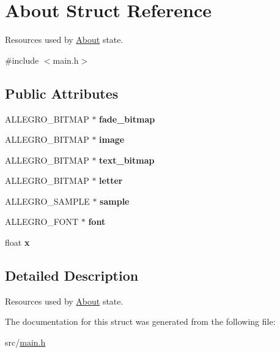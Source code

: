\hypertarget{structAbout}{\section{\-About \-Struct \-Reference}
\label{structAbout}
}


\-Resources used by \hyperlink{structAbout}{\-About} state.  




{\ttfamily \#include $<$main.\-h$>$}

\subsection*{\-Public \-Attributes}
\begin{DoxyCompactItemize}
\item 
\hypertarget{structAbout_a0c80b08e1d60093504bed342b41e51c1}{\-A\-L\-L\-E\-G\-R\-O\-\_\-\-B\-I\-T\-M\-A\-P $\ast$ {\bfseries fade\-\_\-bitmap}}\label{structAbout_a0c80b08e1d60093504bed342b41e51c1}

\item 
\hypertarget{structAbout_a96fca071ec385ca06ca40faf212838fb}{\-A\-L\-L\-E\-G\-R\-O\-\_\-\-B\-I\-T\-M\-A\-P $\ast$ {\bfseries image}}\label{structAbout_a96fca071ec385ca06ca40faf212838fb}

\item 
\hypertarget{structAbout_aec3b0946f4c588bd3d332b944a9d73c3}{\-A\-L\-L\-E\-G\-R\-O\-\_\-\-B\-I\-T\-M\-A\-P $\ast$ {\bfseries text\-\_\-bitmap}}\label{structAbout_aec3b0946f4c588bd3d332b944a9d73c3}

\item 
\hypertarget{structAbout_ae06654b9ad8a38e279659eadb2d0b6a4}{\-A\-L\-L\-E\-G\-R\-O\-\_\-\-B\-I\-T\-M\-A\-P $\ast$ {\bfseries letter}}\label{structAbout_ae06654b9ad8a38e279659eadb2d0b6a4}

\item 
\hypertarget{structAbout_aaae3fb8b349d9973fde2156e1f86c75b}{\-A\-L\-L\-E\-G\-R\-O\-\_\-\-S\-A\-M\-P\-L\-E $\ast$ {\bfseries sample}}\label{structAbout_aaae3fb8b349d9973fde2156e1f86c75b}

\item 
\hypertarget{structAbout_ad14358b4942c0260e502a65b98732f93}{\-A\-L\-L\-E\-G\-R\-O\-\_\-\-F\-O\-N\-T $\ast$ {\bfseries font}}\label{structAbout_ad14358b4942c0260e502a65b98732f93}

\item 
\hypertarget{structAbout_a8ff1ed42ee1abd6ad45def77614015ce}{float {\bfseries x}}\label{structAbout_a8ff1ed42ee1abd6ad45def77614015ce}

\end{DoxyCompactItemize}


\subsection{\-Detailed \-Description}
\-Resources used by \hyperlink{structAbout}{\-About} state. 

\-The documentation for this struct was generated from the following file\-:\begin{DoxyCompactItemize}
\item 
src/\hyperlink{main_8h}{main.\-h}\end{DoxyCompactItemize}
